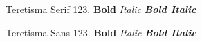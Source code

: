 \documentclass{article}
\begin{document}
\rmfamily Teretisma Serif 123. \textbf{Bold} \textit{Italic} \textbf{\textit{Bold Italic}}

\sffamily Teretisma Sans 123. \textbf{Bold} \textit{Italic} \textbf{\textit{Bold Italic}}
\end{document}
